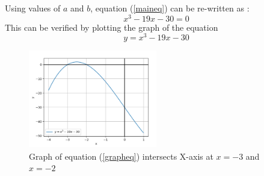 \documentclass[journal,12pt,twocolumn]{IEEEtran}
\begin{document}
    Using values of $a$ and $b$, equation (\ref{maineq}) can be re-written as :
    \begin{equation}
    \label{Peq}
        x^3-19x-30=0
    \end{equation}
    This can be verified by plotting the graph of the equation
    \begin{equation}
    \label{grapheq}
        y=x^3-19x-30
    \end{equation}
\begin{figure}[h]
    \includegraphics[width=0.5\textwidth]{Graph.png}
    \caption{Graph of equation (\ref{grapheq}) intersects X-axis at $x=-3$ and $x=-2$ }
    \label{graph}

\end{figure}
\end{document}
